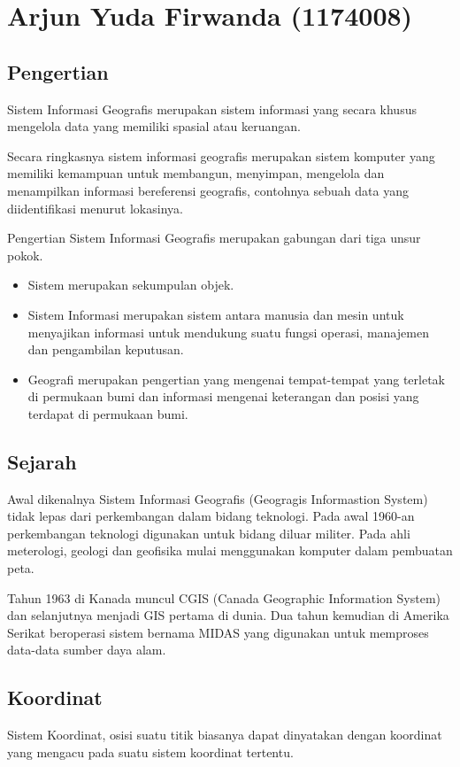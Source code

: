 \section{Arjun Yuda Firwanda (1174008)}
\subsection{Pengertian}
Sistem Informasi Geografis merupakan sistem informasi yang secara khusus mengelola data yang memiliki spasial atau keruangan.

Secara ringkasnya sistem informasi geografis merupakan sistem komputer yang memiliki kemampuan untuk membangun, menyimpan, mengelola dan menampilkan informasi bereferensi geografis, contohnya sebuah data yang diidentifikasi menurut lokasinya.

Pengertian Sistem Informasi Geografis merupakan gabungan dari tiga unsur pokok.
\begin{itemize}
	\item Sistem merupakan sekumpulan objek.
	\item Sistem Informasi merupakan sistem antara manusia dan mesin untuk menyajikan informasi untuk mendukung suatu fungsi operasi, manajemen dan pengambilan keputusan.
	\item Geografi  merupakan pengertian yang mengenai tempat-tempat yang terletak di permukaan bumi dan informasi mengenai keterangan dan posisi yang terdapat di permukaan bumi.
\end{itemize}

\subsection{Sejarah}
Awal dikenalnya Sistem Informasi Geografis (Geogragis Informastion System) tidak lepas dari perkembangan dalam bidang teknologi. Pada awal 1960-an perkembangan teknologi digunakan untuk bidang diluar militer. Pada ahli meterologi, geologi dan geofisika mulai menggunakan komputer dalam pembuatan peta.

Tahun 1963 di Kanada muncul CGIS (Canada Geographic Information System) dan selanjutnya menjadi GIS pertama di dunia. Dua tahun kemudian di Amerika Serikat beroperasi sistem bernama MIDAS yang digunakan untuk memproses data-data sumber daya alam.

\subsection{Koordinat}
Sistem Koordinat, osisi suatu titik biasanya dapat dinyatakan dengan koordinat yang mengacu pada suatu sistem koordinat tertentu.

